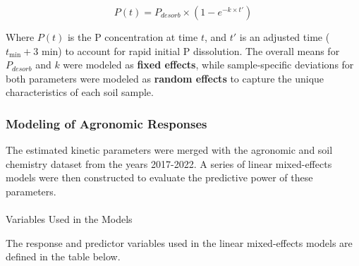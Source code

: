 \documentclass[
  a4paper,
]{article}
\makeatletter
\let\oldparagraph\paragraph
\renewcommand{\paragraph}{
    \@ifstar
      \xxxParagraphStar
      \xxxParagraphNoStar
  }
\newcommand{\xxxParagraphStar}[1]{\oldparagraph*{#1}\mbox{}}
\newcommand{\xxxParagraphNoStar}[1]{\oldparagraph{#1}\mbox{}}
\makeatother
\begin{document}
\[ P(t) = P_{desorb} \times (1 - e^{-k \times t'}) \]

Where \(P(t)\) is the P concentration at time \(t\), and \(t'\) is an
adjusted time (\(t_\text{min} + 3\) min) to account for rapid initial P
dissolution. The overall means for \(P_{desorb}\) and \(k\) were modeled
as \textbf{fixed effects}, while sample-specific deviations for both
parameters were modeled as \textbf{random effects} to capture the unique
characteristics of each soil sample.

\subsubsection{Modeling of Agronomic
Responses}\label{sec-modeling-of-agronomic-responses}

The estimated kinetic parameters were merged with the agronomic and soil
chemistry dataset from the years 2017-2022. A series of linear
mixed-effects models were then constructed to evaluate the predictive
power of these parameters.

\paragraph{Variables Used in the
Models}\label{sec-variables-used-in-the-models}

The response and predictor variables used in the linear mixed-effects
models are defined in the table below.
\end{document}
